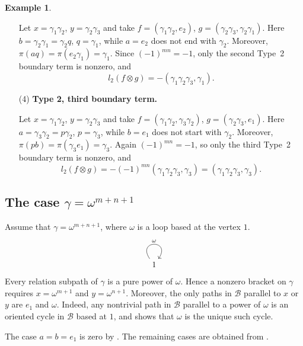 \documentclass[11pt,a4paper,reqno]{amsart}
\newcommand{\mB}{\mathcal B}
\newcommand{\para}[2]{(#1,#2)}
\theoremstyle{plain}
\theoremstyle{definition}
\newtheorem{example}[example]{Example}
\numberwithin{equation}{section}
\begin{document}
\begin{example}
\begin{enumerate}
			Let
			$x=\gamma_1\gamma_2$, $y=\gamma_2\gamma_3$
			and take
			$f=\para{\gamma_1\gamma_2}{e_2}$, $g=\para{\gamma_2\gamma_3}{\gamma_2\gamma_1}$.
			Here
			$b=\gamma_2\gamma_1=\gamma_2q$, $q=\gamma_1$,
			while $a=e_2$ does not end with $\gamma_2$.  Moreover,
			$\pi(aq)=\pi(e_2\gamma_1)=\gamma_1$.
			Since
			$(-1)^{mn}=-1$,
			only the second Type~2 boundary term is nonzero, and
			\[
			l_2(f\otimes g)
			=
			-\para{\gamma_1\gamma_2\gamma_3}{\gamma_1}.
			\]
			
			\item[(4)] \textbf{Type 2, third boundary term.}
			
			Let
			$x=\gamma_1\gamma_2$, $y=\gamma_2\gamma_3$
			and take
			$f=\para{\gamma_1\gamma_2}{\gamma_3\gamma_2}$, $g=\para{\gamma_2\gamma_3}{e_1}$.
			Here
			$a=\gamma_3\gamma_2=p\gamma_2$, $p=\gamma_3$,
			while $b=e_1$ does not start with $\gamma_2$.  Moreover,
			$\pi(pb)=\pi(\gamma_3e_1)=\gamma_3$.
			Again
			$(-1)^{mn}=-1$,
			so only the third Type~2 boundary term is nonzero, and
			\[
			l_2(f\otimes g)
			=
			-(-1)^{mn}
			\para{\gamma_1\gamma_2\gamma_3}{\gamma_3}
			=
			\para{\gamma_1\gamma_2\gamma_3}{\gamma_3}.
			\]
		\end{enumerate}
	\end{example}
	\subsection{The case \texorpdfstring{$\gamma=\omega^{m+n+1}$}{gamma = omega power m+n+1}}
	\label{sec:higher-power-loops}
	
	Assume that
	$\gamma=\omega^{m+n+1}$,
	where $\omega$ is a loop based at the vertex $1$.
	\[\begin{tikzcd}
		1
		\arrow["\omega", from=1-1, to=1-1, loop, in=55, out=125, distance=10mm]
	\end{tikzcd}\]
	Every relation subpath of $\gamma$ is a pure power of $\omega$.  Hence a
	nonzero bracket on $\gamma$ requires
	$x=\omega^{m+1}$ and $y=\omega^{n+1}$.  Moreover, the only paths in $\mB$
	parallel to $x$ or $y$ are $e_1$ and $\omega$.  Indeed, any nontrivial path in
	$\mB$ parallel to a power of $\omega$ is an oriented cycle in $\mB$ based at
	$1$, and  shows that $\omega$ is the unique such cycle.
	
	The case $a=b=e_1$ is zero by
	.  The remaining cases are obtained
	from
	.
	
\end{document}
